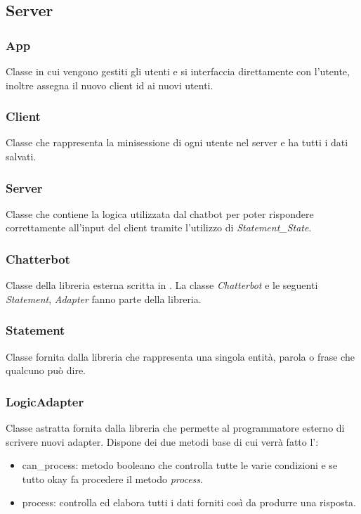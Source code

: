 \subsection{Server}
\subsubsection{App} Classe in cui vengono gestiti gli utenti e si interfaccia direttamente con l'utente, inoltre assegna il nuovo client id ai nuovi utenti.
\subsubsection{Client} Classe che rappresenta la minisessione di ogni utente nel server e ha tutti i dati salvati.
\subsubsection{Server} Classe che contiene la logica utilizzata dal chatbot per poter rispondere correttamente all'input del client tramite l'utilizzo di \textit{Statement\_State}.
\subsubsection{Chatterbot} Classe della libreria esterna scritta in . La classe \textit{Chatterbot} e le seguenti \textit{Statement}, \textit{Adapter} fanno parte della libreria.
\subsubsection{Statement} Classe fornita dalla libreria  che rappresenta una singola entità, parola o frase che qualcuno può dire.
\subsubsection{LogicAdapter} Classe astratta fornita dalla libreria  che permette al programmatore esterno di scrivere nuovi adapter. Dispone dei due metodi base di cui verrà fatto l':
    \begin{itemize}
        \item can\_process: metodo booleano che controlla tutte le varie condizioni e se tutto okay fa procedere il metodo \textit{process}.
        \item process: controlla ed elabora tutti i dati forniti così da produrre una risposta.
    \end{itemize}
